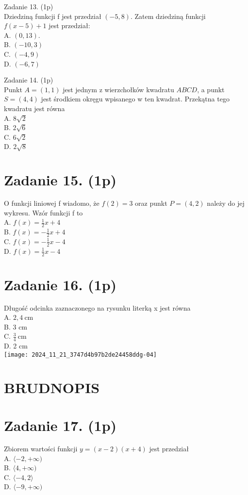 \documentclass[10pt]{article}
\begin{document}
Zadanie 13. (1p)\\
Dziedziną funkcji f jest przedział \((-5,8)\). Zatem dziedziną funkcji \(f(x-5)+1\) jest przedział:\\
A. \((0,13)\).\\
B. \((-10,3)\)\\
C. \((-4,9)\)\\
D. \((-6,7)\)

Zadanie 14. (1p)\\
Punkt \(A=(1,1)\) jest jednym z wierzchołków kwadratu \(A B C D\), a punkt \(S=(4,4)\) jest środkiem okręgu wpisanego w ten kwadrat. Przekątna tego kwadratu jest równa\\
A. \(8 \sqrt{2}\)\\
B. \(2 \sqrt{6}\)\\
C. \(6 \sqrt{2}\)\\
D. \(2 \sqrt{8}\)

\section*{Zadanie 15. (1p)}
O funkcji liniowej f wiadomo, że \(f(2)=3\) oraz punkt \(P=(4,2)\) należy do jej wykresu. Wzór funkcji f to\\
A. \(f(x)=\frac{1}{2} x+4\)\\
B. \(f(x)=-\frac{1}{2} x+4\)\\
C. \(f(x)=-\frac{1}{2} x-4\)\\
D. \(f(x)=\frac{1}{2} x-4\)

\section*{Zadanie 16. (1p)}
Długość odcinka zaznaczonego na rysunku literką x jest równa\\
A. \(2,4 \mathrm{~cm}\)\\
B. 3 cm\\
C. \(\frac{3}{4} \mathrm{~cm}\)\\
D. 2 cm\\
\texttt{[image: 2024\_11\_21\_3747d4b97b2de24458ddg-04]}

\section*{BRUDNOPIS}
\section*{Zadanie 17. (1p)}
Zbiorem wartości funkcji \(y=(x-2)(x+4)\) jest przedział\\
A. \(\langle-2,+\infty)\)\\
B. \(\langle 4,+\infty)\)\\
C. \(\langle-4,2\rangle\)\\
D. \(\langle-9,+\infty)\)
\end{document}

